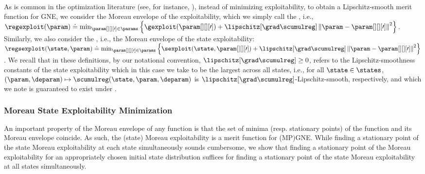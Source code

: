 As is common in the optimization literature (see, for instance, \citet{davis2018subgradient}), instead of minimizing exploitability, to obtain a Lipschitz-smooth merit function for GNE, we consider the Moreau envelope of the exploitability, which we simply call the , i.e., $\regexploit (\param) \doteq \min_{\param[][][\prime] \in \params} \left\{ \gexploit (\param[][][\prime]) + \lipschitz[{\grad \scumulreg}] \left\| \param - \param[][][\prime] \right\|^2\right\}$. 
Similarly, we also consider the , i.e., the Moreau envelope of the state exploitability: $\regsexploit (\state, \param) \doteq \min_{\param[][][\prime] \in \params} \left\{ \sexploit (\state, \param[][][\prime]) + \lipschitz[{\grad \scumulreg}] \left\| \param - \param[][][\prime] \right\|^2\right\}$.
We recall that in these definitions, by our notational convention, $\lipschitz[{\grad \scumulreg}] \geq 0$, refers to the Lipschitz-smoothness constants of the state exploitability which in this case we take to be the largest across all states, i.e., for all $\state \in \states$, $(\param, \deparam) \mapsto \scumulreg(\state, \param, \deparam)$ is $\lipschitz[{\grad \scumulreg}]$-Lipschitz-smooth, respectively, and which we note is guaranteed to exist under .  
\fi


\subsubsection{Moreau State Exploitability Minimization}

An important property of the Moreau envelope of any function is that the set of minima (resp. stationary points) of the function and its Moreau envelope coincide.
As such, the (state) Moreau exploitability is a merit function for (MP)GNE.
While finding a stationary point of the state Moreau exploitability at each state simultaneously sounds cumbersome, we show that finding a stationary point of the Moreau exploitability for an appropriately chosen initial state distribution suffices for finding a stationary point of the state Moreau exploitability at all states simultaneously.

